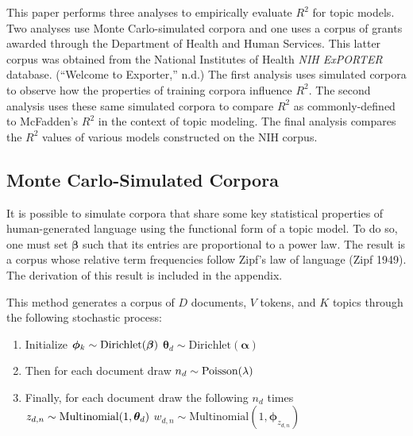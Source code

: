 \documentclass[conference,final,]{IEEEtran}
\providecommand{\tightlist}{%
  \setlength{\itemsep}{0pt}\setlength{\parskip}{0pt}}
\begin{document}
This paper performs three analyses to empirically evaluate \(R^2\) for
topic models. Two analyses use Monte Carlo-simulated corpora and one
uses a corpus of grants awarded through the Department of Health and
Human Services. This latter corpus was obtained from the National
Institutes of Health \emph{NIH ExPORTER} database. (``Welcome to
Exporter,'' n.d.) The first analysis uses simulated corpora to observe
how the properties of training corpora influence \(R^2\). The second
analysis uses these same simulated corpora to compare \(R^2\) as
commonly-defined to McFadden's \(R^2\) in the context of topic modeling.
The final analysis compares the \(R^2\) values of various models
constructed on the NIH corpus.

\hypertarget{monte-carlo-simulated-corpora}{%
\subsection{Monte Carlo-Simulated
Corpora}\label{monte-carlo-simulated-corpora}}

It is possible to simulate corpora that share some key statistical
properties of human-generated language using the functional form of a
topic model. To do so, one must set \(\boldsymbol\beta\) such that its
entries are proportional to a power law. The result is a corpus whose
relative term frequencies follow Zipf's law of language (Zipf 1949). The
derivation of this result is included in the appendix.

This method generates a corpus of \(D\) documents, \(V\) tokens, and
\(K\) topics through the following stochastic process:

\begin{enumerate}
\def\labelenumi{\arabic{enumi}.}
\tightlist
\item
  Initialize
  \(\\ \boldsymbol\phi_k \sim \text{Dirichlet}(\boldsymbol\beta)\\\)
  \(\boldsymbol\theta_d \sim \text{Dirichlet}(\boldsymbol\alpha)\)
\item
  Then for each document draw \(\\ n_d \sim \text{Poisson}(\lambda)\)
\item
  Finally, for each document draw the following \(n_d\) times
  \(\\ z_{d,n} \sim \text{Multinomial}(1, \boldsymbol\theta_d)\\\)
  \(w_{d,n} \sim \text{Multinomial}(1, \boldsymbol\phi_{z_{d,n}})\)
\end{enumerate}
\end{document}
